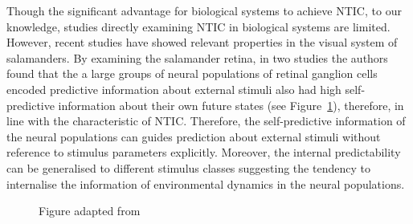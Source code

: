 \documentclass[utf8]{article}
\begin{document}
			Though the significant advantage for biological systems to achieve NTIC, to our knowledge, studies directly examining NTIC in biological systems are limited. However,  recent studies have showed relevant properties in the visual system of salamanders. By examining the salamander retina, in two studies \citep{Palmer2015, sederberg2018learning} the authors found that the a large groups of neural populations of retinal ganglion cells encoded predictive information about external stimuli also had high self-predictive information about their own future states (see Figure~\ref{fig:sederberg2018learning}), therefore, in line with the characteristic of NTIC. Therefore, the self-predictive information of the neural populations can guides prediction about external stimuli without reference to stimulus parameters explicitly. Moreover, the internal predictability can be generalised to different stimulus classes suggesting the tendency to internalise the information of environmental dynamics in the neural populations. 

			\begin{figure}[H]
				\caption{Figure adapted from \cite{sederberg2018learning}}
				\label{fig:sederberg2018learning}
			\end{figure}
\end{document}
